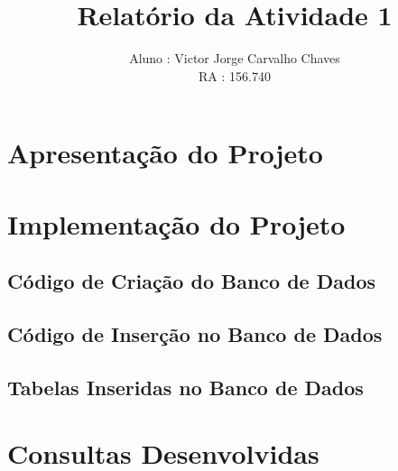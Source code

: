 \documentclass[a4paper,11pt]{article}
\title{Relatório da Atividade 1}
\author{Aluno : Victor Jorge Carvalho Chaves \\ RA : 156.740}
\date{}
\begin{document}
\maketitle


\section{Apresentação do Projeto}


\section{Implementação do Projeto}

\subsection{Código de Criação do Banco de Dados}


\pagebreak

\subsection{Código de Inserção no Banco de Dados}


\subsection{Tabelas Inseridas no Banco de Dados}


\pagebreak

\section{Consultas Desenvolvidas}

\end{document}
